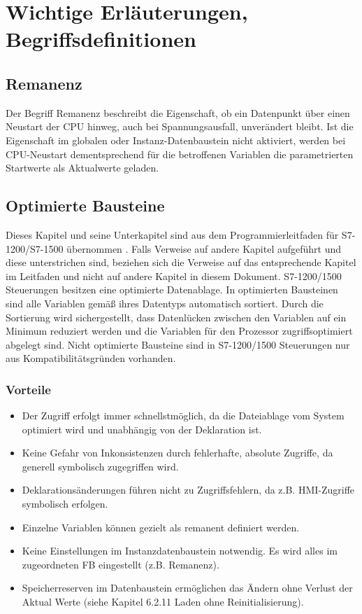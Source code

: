 \chapter{Wichtige Erläuterungen, Begriffsdefinitionen}\label{chap:Wichtige Erläuterungen, Begriffsdefinitionen}
\section{Remanenz}\label{sec:Remanenz}

Der Begriff \glqq Remanenz\grqq{} beschreibt die Eigenschaft, ob ein Datenpunkt über einen Neustart der CPU hinweg, auch bei Spannungsausfall, unverändert bleibt. Ist die Eigenschaft im globalen oder Instanz-Datenbaustein nicht aktiviert, werden bei CPU-Neustart dementsprechend für die betroffenen Variablen die parametrierten Startwerte als Aktualwerte geladen.

\clearpage

\section{Optimierte Bausteine}\label{sec:Optimierte Bausteine}

Dieses Kapitel und seine Unterkapitel sind aus dem Programmierleitfaden für S7-1200/S7-1500 übernommen \cite[\textbf{TODO!}]{todo}. Falls Verweise auf andere Kapitel aufgeführt und diese unterstrichen sind, beziehen sich die Verweise auf das entsprechende Kapitel im Leitfaden und nicht auf andere Kapitel in diesem Dokument.
S7-1200/1500 Steuerungen besitzen eine optimierte Datenablage. In optimierten Bausteinen sind alle Variablen gemäß ihres Datentyps automatisch sortiert. Durch die Sortierung wird sichergestellt, dass Datenlücken zwischen den Variablen auf ein Minimum reduziert werden und die Variablen für den Prozessor zugriffsoptimiert abgelegt sind.  
Nicht optimierte Bausteine sind in S7-1200/1500 Steuerungen nur aus Kompatibilitätsgründen vorhanden. 

\subsection{Vorteile}\label{subsec:Vorteile}

\begin{itemize}
    \item Der Zugriff erfolgt immer schnellstmöglich, da die Dateiablage vom System optimiert wird und unabhängig von der Deklaration ist.
    \item Keine Gefahr von Inkonsistenzen durch fehlerhafte, absolute Zugriffe, da generell symbolisch zugegriffen wird.
    \item Deklarationsänderungen führen nicht zu Zugriffsfehlern, da z.B. HMI-Zugriffe symbolisch erfolgen. 
    \item Einzelne Variablen können gezielt als remanent definiert werden.
    \item Keine Einstellungen im Instanzdatenbaustein notwendig. Es wird alles im zugeordneten FB eingestellt (z.B. Remanenz).
    \item Speicherreserven im Datenbaustein ermöglichen das Ändern ohne Verlust der Aktual Werte (siehe Kapitel 6.2.11 Laden ohne Reinitialisierung).
\end{itemize}

